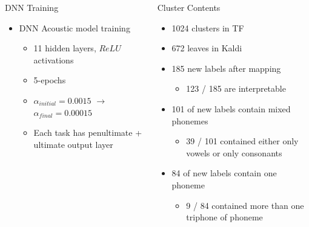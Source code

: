 \documentclass[final]{beamer} %
\newlength{\columnheight}
\begin{document}
\begin{frame}
\begin{columns}
\begin{column}{0.23\textwidth}
{        \vfill
        
        \begin{block}{\boxnumber DNN Training}          
          \begin{itemize}    
          \item DNN Acoustic model training
            \begin{itemize}
            \item 11 hidden layers, $ReLU$ activations
            \item 5-epochs
            \item $\alpha_{initial}=0.0015$ $\rightarrow$ $\alpha_{final}=0.00015$
            \item Each task has penultimate + ultimate output layer
            \end{itemize}
          \end{itemize}
        \end{block}

        \vfill
        
      } %
    \end{column}

    
    \begin{column}{0.23\textwidth}
      \parbox[t][\columnheight]{.9\textwidth}{

        \vspace{1cm}               %
        
        \begin{block}{\boxnumber Cluster Contents}
          
          \begin{itemize}
          \item 1024 clusters in TF
          \item 672 leaves in Kaldi

            \vspace{1cm}
          \item 185 new labels after mapping
            \begin{itemize}
            \item 123 / 185 are interpretable
            \end{itemize}
          \item 101 of new labels contain mixed phonemes
            \begin{itemize}
            \item 39 / 101 contained either only vowels or only consonants
            \end{itemize}
          \item 84 of new labels contain one phoneme
            \begin{itemize}
            \item 9 / 84 contained more than one triphone of phoneme
            \end{itemize}
          \end{itemize}
          

\end{block}}
\end{column}
\end{columns}
\end{frame}
\end{document}
